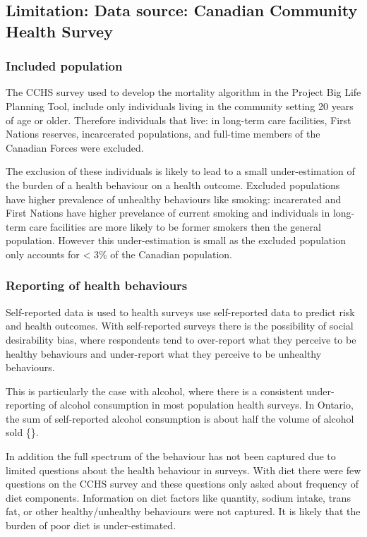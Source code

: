 \documentclass[]{book}
\begin{document}
\subsection{Limitation: Data source: Canadian Community Health
Survey}\label{limitation-data-source-canadian-community-health-survey}

\subsubsection{Included population}\label{included-population}

The CCHS survey used to develop the mortality algorithm in the Project
Big Life Planning Tool, include only individuals living in the community
setting 20 years of age or older. Therefore individuals that live: in
long-term care facilities, First Nations reserves, incarcerated
populations, and full-time members of the Canadian Forces were excluded.

The exclusion of these individuals is likely to lead to a small
under-estimation of the burden of a health behaviour on a health
outcome. Excluded populations have higher prevalence of unhealthy
behaviours like smoking: incarerated and First Nations have higher
prevelance of current smoking and individuals in long-term care
facilities are more likely to be former smokers then the general
population. However this under-estimation is small as the excluded
population only accounts for \textless{} 3\% of the Canadian population.

\subsubsection{Reporting of health
behaviours}\label{reporting-of-health-behaviours}

Self-reported data is used to health surveys use self-reported data to
predict risk and health outcomes. With self-reported surveys there is
the possibility of social desirability bias, where respondents tend to
over-report what they perceive to be healthy behaviours and under-report
what they perceive to be unhealthy behaviours.

This is particularly the case with alcohol, where there is a consistent
under-reporting of alcohol consumption in most population health
surveys. In Ontario, the sum of self-reported alcohol consumption is
about half the volume of alcohol sold \{\citet{ONalcohol}\}.

In addition the full spectrum of the behaviour has not been captured due
to limited questions about the health behaviour in surveys. With diet
there were few questions on the CCHS survey and these questions only
asked about frequency of diet components. Information on diet factors
like quantity, sodium intake, trans fat, or other healthy/unhealthy
behaviours were not captured. It is likely that the burden of poor diet
is under-estimated.
\end{document}
